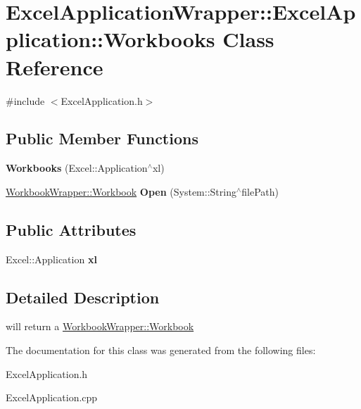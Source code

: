 \hypertarget{class_excel_application_wrapper_1_1_excel_application_1_1_workbooks}{}\section{Excel\+Application\+Wrapper\+:\+:Excel\+Application\+:\+:Workbooks Class Reference}
\label{class_excel_application_wrapper_1_1_excel_application_1_1_workbooks}


{\ttfamily \#include $<$Excel\+Application.\+h$>$}

\subsection*{Public Member Functions}
\begin{DoxyCompactItemize}
\item 
\hypertarget{class_excel_application_wrapper_1_1_excel_application_1_1_workbooks_a8f3d2108eecffc9a17e348326149ecbd}{}{\bfseries Workbooks} (Excel\+::\+Application$^\wedge$xl)\label{class_excel_application_wrapper_1_1_excel_application_1_1_workbooks_a8f3d2108eecffc9a17e348326149ecbd}

\item 
\hypertarget{class_excel_application_wrapper_1_1_excel_application_1_1_workbooks_a41d20bfb1f86751db5ff99141663f99d}{}\hyperlink{class_workbook_wrapper_1_1_workbook}{Workbook\+Wrapper\+::\+Workbook} {\bfseries Open} (System\+::\+String$^\wedge$file\+Path)\label{class_excel_application_wrapper_1_1_excel_application_1_1_workbooks_a41d20bfb1f86751db5ff99141663f99d}

\end{DoxyCompactItemize}
\subsection*{Public Attributes}
\begin{DoxyCompactItemize}
\item 
\hypertarget{class_excel_application_wrapper_1_1_excel_application_1_1_workbooks_aa9b0df11dc72241fcc20e372542f918a}{}Excel\+::\+Application {\bfseries xl}\label{class_excel_application_wrapper_1_1_excel_application_1_1_workbooks_aa9b0df11dc72241fcc20e372542f918a}

\end{DoxyCompactItemize}


\subsection{Detailed Description}
will return a \hyperlink{class_workbook_wrapper_1_1_workbook}{Workbook\+Wrapper\+::\+Workbook} 

The documentation for this class was generated from the following files\+:\begin{DoxyCompactItemize}
\item 
Excel\+Application.\+h\item 
Excel\+Application.\+cpp\end{DoxyCompactItemize}
